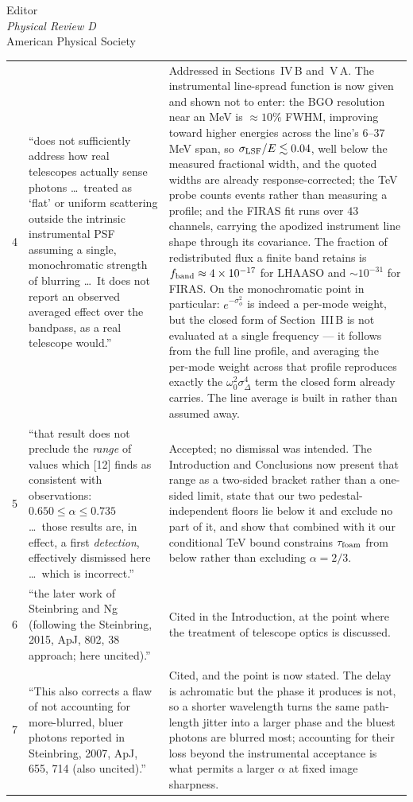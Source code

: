 \documentclass[12pt]{letter}
\begin{document}
\begin{letter}{Editor\\
\textit{Physical Review D}\\
American Physical Society}
\begin{longtable}{@{}p{}p{}p{}@{}}
4 & ``does not sufficiently address how real telescopes actually sense
photons \ldots\ treated as `flat' or uniform scattering outside the intrinsic
instrumental PSF assuming a single, monochromatic strength of blurring
\ldots\ It does not report an observed averaged effect over the bandpass, as
a real telescope would.''
& Addressed in Sections~IV\,B and~V\,A.  The instrumental line-spread
function is now given and shown not to enter: the BGO resolution near an MeV
is $\approx\!10\%$ FWHM, improving toward higher energies across the line's
$6$--$37$\,MeV span, so $\sigma_{\rm LSF}/E\lesssim0.04$, well below the
measured fractional width, and the quoted widths are already
response-corrected; the TeV probe counts events rather than measuring a
profile; and the FIRAS fit runs over $43$ channels, carrying the apodized
instrument line shape through its covariance.  The fraction of redistributed
flux a finite band retains is $f_{\rm band}\approx4\times10^{-17}$ for LHAASO
and $\sim\!10^{-31}$ for FIRAS.  On the monochromatic point in particular:
$e^{-\sigma_\phi^2}$ is indeed a per-mode weight, but the closed form of
Section~III\,B is not evaluated at a single frequency --- it follows from the
full line profile, and averaging the per-mode weight across that profile
reproduces exactly the $\omega_0^2\sigma_\Delta^4$ term the closed form
already carries.  The line average is built in rather than assumed
away. \\[2ex]

5 & ``that result does not preclude the \emph{range} of values which [12]
finds as consistent with observations: $0.650\leq\alpha\leq0.735$ \ldots\
those results are, in effect, a first \emph{detection}, effectively dismissed
here \ldots\ which is incorrect.''
& Accepted; no dismissal was intended.  The Introduction and Conclusions now
present that range as a two-sided bracket rather than a one-sided limit,
state that our two pedestal-independent floors lie below it and exclude no
part of it, and show that combined with it our conditional TeV bound
constrains $\tau_{\rm foam}$ from below rather than excluding
$\alpha=2/3$. \\[2ex]

6 & ``the later work of Steinbring and Ng (following the Steinbring, 2015,
ApJ, 802, 38 approach; here uncited).''
& Cited in the Introduction, at the point where the treatment of telescope
optics is discussed. \\[2ex]

7 & ``This also corrects a flaw of not accounting for more-blurred, bluer
photons reported in Steinbring, 2007, ApJ, 655, 714 (also uncited).''
& Cited, and the point is now stated.  The delay is achromatic but the phase
it produces is not, so a shorter wavelength turns the same path-length jitter
into a larger phase and the bluest photons are blurred most; accounting for
their loss beyond the instrumental acceptance is what permits a larger
$\alpha$ at fixed image sharpness. \\[2ex]


\end{longtable}
\end{letter}
\end{document}
